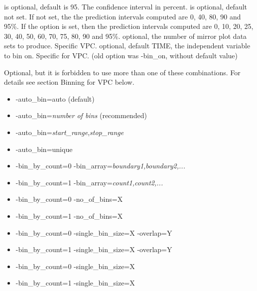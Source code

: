 \begin{optionlist}
\nextopt
{}
is optional, default is 95. The confidence interval in percent. 
\nextopt
{}
is optional, default not set. If not set, the the prediction intervals computed are 0, 40, 80, 90 and 95\%. 
If the option is set, then the prediction intervals computed are 0, 10, 20, 25, 30, 40, 50, 60, 70, 75, 80, 90 and 95\%.  
\nextopt
{}
optional, the number of mirror plot data sets to produce. Specific VPC. 
\nextopt
{}
optional, default TIME, the independent variable to bin on. Specific for VPC. (old  option was -bin\_on, without default value) 
\nextopt
\end{optionlist}
Optional, but it is forbidden to use more than one of these combinations. For details see section Binning for VPC below.
\begin{itemize}
	\item -auto\_bin=auto   (default)
	\item -auto\_bin=\emph{number of bins} (recommended)
	\item -auto\_bin=\emph{start\_range},\emph{stop\_range}
	\item -auto\_bin=unique
	\item -bin\_by\_count=0 -bin\_array=\emph{boundary1,boundary2,...}
	\item -bin\_by\_count=1 -bin\_array=\emph{count1,count2,...}
	\item -bin\_by\_count=0 -no\_of\_bins=X
	\item -bin\_by\_count=1 -no\_of\_bins=X
	\item -bin\_by\_count=0 -single\_bin\_size=X -overlap=Y
	\item -bin\_by\_count=1 -single\_bin\_size=X -overlap=Y
	\item -bin\_by\_count=0 -single\_bin\_size=X
	\item -bin\_by\_count=1 -single\_bin\_size=X
\end{itemize}

